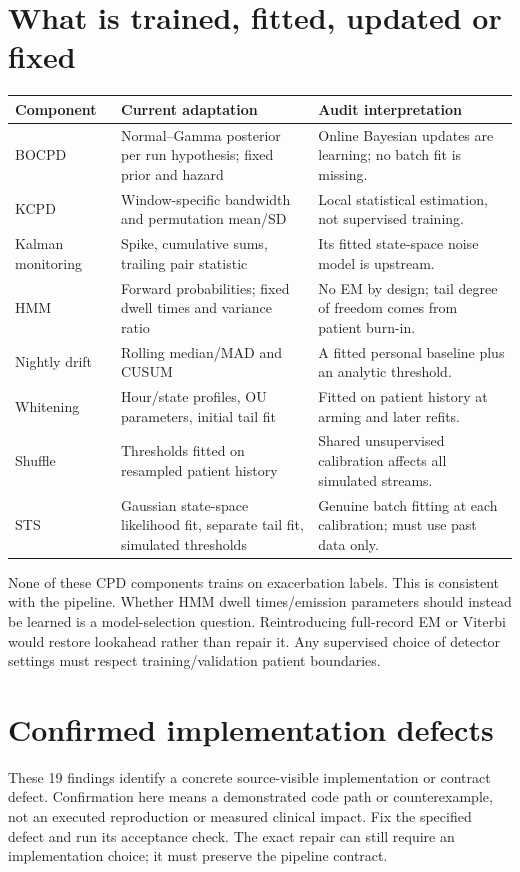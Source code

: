 \documentclass[11pt,a4paper]{article}
\begin{document}
\section{What is trained, fitted, updated or fixed}
\begin{tabularx}{\textwidth}{@{}p{}XX@{}}
\toprule Component & Current adaptation & Audit interpretation \\
\midrule
BOCPD & Normal--Gamma posterior per run hypothesis; fixed prior and hazard & Online Bayesian updates are learning; no batch fit is missing. \\
KCPD & Window-specific bandwidth and permutation mean/SD & Local statistical estimation, not supervised training. \\
Kalman monitoring & Spike, cumulative sums, trailing pair statistic & Its fitted state-space noise model is upstream. \\
HMM & Forward probabilities; fixed dwell times and variance ratio & No EM by design; tail degree of freedom comes from patient burn-in. \\
Nightly drift & Rolling median/MAD and CUSUM & A fitted personal baseline plus an analytic threshold. \\
Whitening & Hour/state profiles, OU parameters, initial tail fit & Fitted on patient history at arming and later refits. \\
Shuffle & Thresholds fitted on resampled patient history & Shared unsupervised calibration affects all simulated streams. \\
STS & Gaussian state-space likelihood fit, separate tail fit, simulated thresholds & Genuine batch fitting at each calibration; must use past data only. \\
\bottomrule
\end{tabularx}

None of these CPD components trains on exacerbation labels. This is consistent with
the pipeline. Whether HMM dwell times/emission parameters should instead be learned
is a model-selection question. Reintroducing full-record EM or Viterbi would restore
lookahead rather than repair it. Any supervised choice of detector settings must
respect training/validation patient boundaries.

\section{Confirmed implementation defects}

These 19 findings identify a concrete source-visible implementation or contract defect. Confirmation here means a demonstrated code path or counterexample, not an executed reproduction or measured clinical impact. Fix the specified defect and run its acceptance check. The exact repair can still require an implementation choice; it must preserve the pipeline contract.
\end{document}
